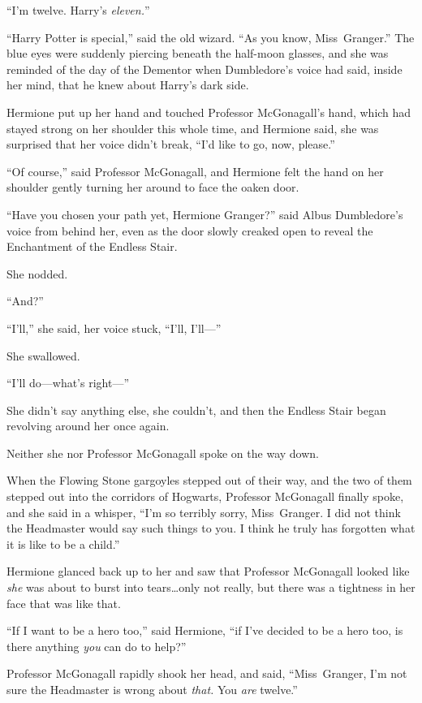 “I’m twelve. Harry’s \emph{eleven.}”

“Harry Potter is special,” said the old wizard. “As you know, Miss~Granger.” The blue eyes were suddenly piercing beneath the half-moon glasses, and she was reminded of the day of the Dementor when Dumbledore’s voice had said, inside her mind, that he knew about Harry’s dark side.

Hermione put up her hand and touched Professor McGonagall’s hand, which had stayed strong on her shoulder this whole time, and Hermione said, she was surprised that her voice didn’t break, “I’d like to go, now, please.”

“Of course,” said Professor McGonagall, and Hermione felt the hand on her shoulder gently turning her around to face the oaken door.

“Have you chosen your path yet, Hermione Granger?” said Albus Dumbledore’s voice from behind her, even as the door slowly creaked open to reveal the Enchantment of the Endless Stair.

She nodded.

“And?”

“I’ll,” she said, her voice stuck, “I’ll, I’ll—”

She swallowed.

“I’ll do—what’s right—”

She didn’t say anything else, she couldn’t, and then the Endless Stair began revolving around her once again.

Neither she nor Professor McGonagall spoke on the way down.

When the Flowing Stone gargoyles stepped out of their way, and the two of them stepped out into the corridors of Hogwarts, Professor McGonagall finally spoke, and she said in a whisper, “I’m so terribly sorry, Miss~Granger. I did not think the Headmaster would say such things to you. I think he truly has forgotten what it is like to be a child.”

Hermione glanced back up to her and saw that Professor McGonagall looked like \emph{she} was about to burst into tears…only not really, but there was a tightness in her face that was like that.

“If I want to be a hero too,” said Hermione, “if I’ve decided to be a hero too, is there anything \emph{you} can do to help?”

Professor McGonagall rapidly shook her head, and said, “Miss~Granger, I’m not sure the Headmaster is wrong about \emph{that.} You \emph{are} twelve.”

